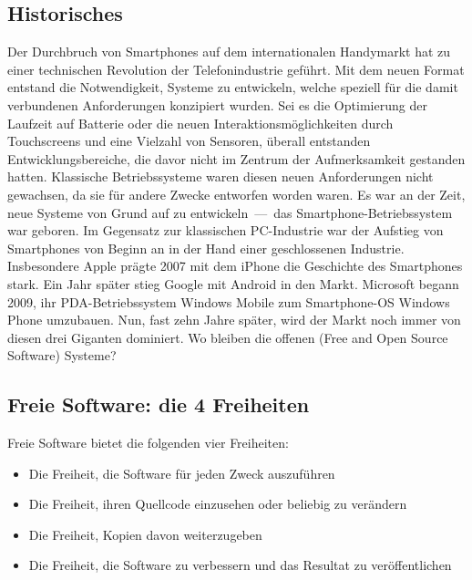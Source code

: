 \subsection{Historisches}
Der Durchbruch von Smartphones auf dem internationalen Handymarkt hat zu einer technischen Revolution der Telefonindustrie geführt. Mit dem neuen Format entstand die Notwendigkeit, Systeme zu entwickeln, welche speziell für die damit verbundenen Anforderungen konzipiert wurden. Sei es die Optimierung der Laufzeit auf Batterie oder die neuen Interaktionsmöglichkeiten durch Touchscreens und eine Vielzahl von Sensoren, überall entstanden Entwicklungsbereiche, die davor nicht im Zentrum der Aufmerksamkeit gestanden hatten. Klassische Betriebssysteme waren diesen neuen Anforderungen nicht gewachsen, da sie für andere Zwecke entworfen worden waren. Es war an der Zeit, neue Systeme von Grund auf zu \mbox{entwickeln --- das} \mbox{Smartphone-Betriebssystem} war geboren.
Im Gegensatz zur klassischen \mbox{PC-Industrie} war der Aufstieg von Smartphones von Beginn an in der Hand einer geschlossenen Industrie. Insbesondere Apple prägte 2007 mit dem iPhone die Geschichte des Smartphones stark. Ein Jahr später stieg Google mit Android in den Markt. Microsoft begann 2009, ihr \mbox{PDA-Betriebssystem} Windows Mobile zum \mbox{Smartphone-OS} Windows Phone umzubauen. Nun, fast zehn Jahre später, wird der Markt noch immer von diesen drei Giganten dominiert. Wo bleiben die offenen (Free and Open Source Software) Systeme?
\newline

\subsection{Freie Software: die 4 Freiheiten}
Freie Software bietet die folgenden vier Freiheiten\thinspace\cite{online:fsf_vier-freiheiten}:
\begin{itemize}
	\renewcommand\labelitemi{--}
	\item Die Freiheit, die Software für jeden Zweck auszuführen
	\item  Die Freiheit, ihren Quellcode einzusehen oder beliebig zu verändern
	\item Die Freiheit, Kopien davon weiterzugeben
	\item Die Freiheit, die Software zu verbessern und das Resultat zu veröffentlichen
\end{itemize}
\mbox{}

